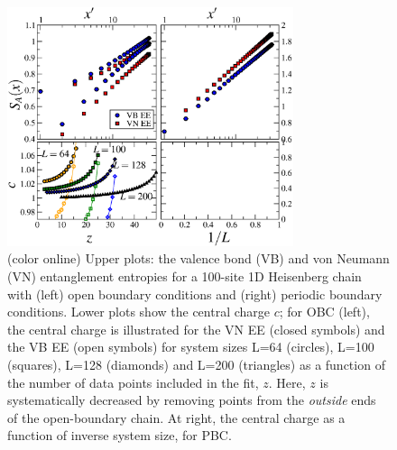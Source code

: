 \documentclass[prl,aps,twocolumn,floatfix,amsmath,amssymb,superscriptaddress,tightenlines]{revtex4}
\begin{document}
\begin{figure}
{
\includegraphics[width=3.3in]{4-panelFIG1.eps}
\caption{(color online) Upper plots: the valence bond (VB) and von Neumann (VN) entanglement entropies for a 100-site 1D Heisenberg chain with (left) open boundary conditions and (right) periodic boundary conditions.  Lower plots show the central charge $c$; for OBC (left), the central charge is illustrated for the VN EE (closed symbols) and the VB EE (open symbols) for system sizes L=64 (circles), L=100 (squares), L=128 (diamonds) and L=200 (triangles) as a function of the number of data points included in the fit, $z$.  Here, $z$ is systematically decreased by removing points from the {\it outside} ends of the open-boundary chain.  At right, the central charge as a function of inverse system size, for PBC.
\label{1D}}}
\end{figure}
\end{document}
